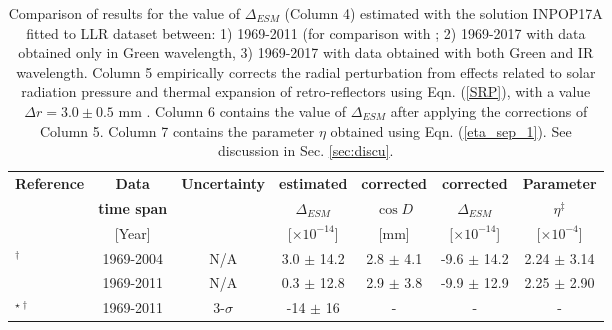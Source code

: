 \documentclass[fleqn,usenatbib,referee]{mnras}
\begin{document}
\begin{table*}
\caption{Comparison of results for the value of $\Delta_{ESM}$ (Column 4) estimated with the solution INPOP17A fitted to LLR dataset between: 1) 1969-2011 (for comparison with \protect\cite{Williams2012,Muller2012}; 2) 1969-2017 with data obtained only in Green wavelength, 3) 1969-2017 with data obtained with both Green and IR wavelength. Column 5 empirically corrects the radial perturbation from effects related to solar radiation pressure and thermal expansion of retro-reflectors using Eqn. (\ref{SRP}), with a value $\Delta{r}= 3.0 \pm 0.5$ mm \protect\cite[]{Williams2012}. Column 6 contains the value of $\Delta_{ESM}$ after applying the corrections of Column 5. Column 7 contains the parameter $\eta$ obtained using Eqn. (\ref{eta_sep_1}). See discussion in Sec. \ref{sec:discu}.}
\label{mgmi}
\begin{tabular}{lcccccc}
\toprule
\textbf{Reference} 		             &\textbf{Data}	       & \textbf{Uncertainty}		& \textbf{estimated}      		                         &\textbf{corrected} 					& \textbf{corrected}                        & \textbf{Parameter}                       \\
				                                &\textbf{time span}	 & 		                                     & \textbf{$\Delta_{ESM}$} 	                         & \textbf{$\cos{D}$} 					& \textbf{$\Delta_{ESM}$}           & \textbf{$\eta^\ddag$}                     \\ 
				                                &{[}Year{]}		       & 		                                     & [$\times10^{-14}$] 			                         & [mm] 								& [$\times10^{-14}$]                      & [$\times 10^{-4}$]                       \\ \midrule
\cite{Williams2009}$^\dag$ 		&1969-2004 		       & N/A 			                  & 3.0 $\pm$ 14.2 				                         & 2.8 $\pm$ 4.1 						& -9.6 $\pm$ 14.2                            & 2.24 $\pm$ 3.14                         \\
\cite{Williams2012} 		             &1969-2011 		       & N/A		                              & 0.3 $\pm$ 12.8 			 	                         & 2.9 $\pm$ 3.8 						& -9.9 $\pm$ 12.9                            & 2.25 $\pm$ 2.90                        \\
\cite{Muller2012}$^{\star\dag}$	&1969-2011 		       & 3-$\sigma$		                  & -14 $\pm$ 16    			                               & - 						                   & -                                                    & -                         \\ 

\end{tabular}
\end{table*}
\end{document}

